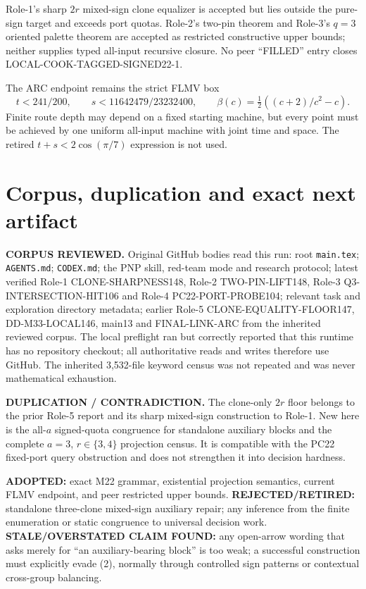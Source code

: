 \documentclass[11pt]{article}
\begin{document}
Role-1's sharp $2r$ mixed-sign clone equalizer is accepted but lies outside
the pure-sign target and exceeds port quotas.  Role-2's two-pin theorem and
Role-3's $q=3$ oriented palette theorem are accepted as restricted constructive
upper bounds; neither supplies typed all-input recursive closure.  No peer
``FILLED'' entry closes LOCAL-COOK-TAGGED-SIGNED22-1.

The ARC endpoint remains the strict FLMV box
\[
 t<241/200,\qquad s<11642479/23232400,
 \qquad \beta(c)=\tfrac12((c+2)/c^2-c).
\]
Finite route depth may depend on a fixed starting machine, but every point
must be achieved by one uniform all-input machine with joint time and space.
The retired $t+s<2\cos(\pi/7)$ expression is not used.

\section{Corpus, duplication and exact next artifact}
\textbf{CORPUS REVIEWED.} Original GitHub bodies read this run: root
\texttt{main.tex}; \texttt{AGENTS.md}; \texttt{CODEX.md}; the PNP skill,
red-team mode and research protocol; latest verified Role-1 CLONE-SHARPNESS148,
Role-2 TWO-PIN-LIFT148, Role-3 Q3-INTERSECTION-HIT106 and Role-4
PC22-PORT-PROBE104; relevant task and exploration directory metadata; earlier
Role-5 CLONE-EQUALITY-FLOOR147, DD-M33-LOCAL146, main13 and FINAL-LINK-ARC from
the inherited reviewed corpus.  The local preflight ran but correctly reported
that this runtime has no repository checkout; all authoritative reads and
writes therefore use GitHub.  The inherited 3,532-file keyword census was not
repeated and was never mathematical exhaustion.

\textbf{DUPLICATION / CONTRADICTION.} The clone-only $2r$ floor belongs to the
prior Role-5 report and its sharp mixed-sign construction to Role-1.  New here
is the all-$a$ signed-quota congruence for standalone auxiliary blocks and the
complete $a=3$, $r\in\{3,4\}$ projection census.  It is compatible with the
PC22 fixed-port query obstruction and does not strengthen it into decision
hardness.

\textbf{ADOPTED:} exact M22 grammar, existential projection semantics, current
FLMV endpoint, and peer restricted upper bounds.  \textbf{REJECTED/RETIRED:}
standalone three-clone mixed-sign auxiliary repair; any inference from the
finite enumeration or static congruence to universal decision work.
\textbf{STALE/OVERSTATED CLAIM FOUND:} any open-arrow wording that asks merely
for ``an auxiliary-bearing block'' is too weak; a successful construction must
explicitly evade (2), normally through controlled sign patterns or contextual
cross-group balancing.
\end{document}

